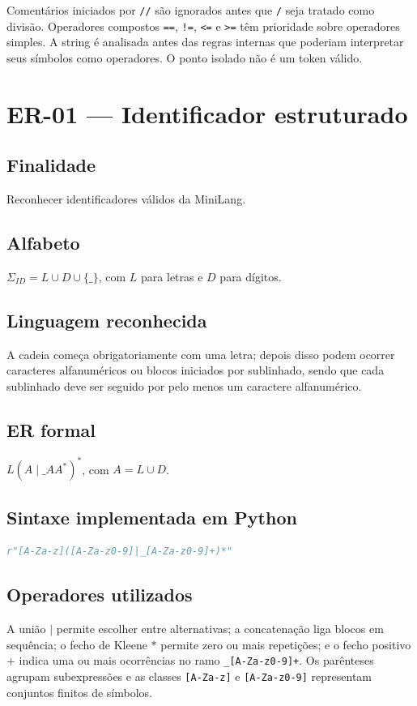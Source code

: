 \documentclass[12pt,a4paper,oneside]{report}
\begin{document}
Comentários iniciados por \texttt{//} são ignorados antes que \texttt{/} seja tratado como divisão. Operadores compostos \texttt{==}, \texttt{!=}, \texttt{<=} e \texttt{>=} têm prioridade sobre operadores simples. A string é analisada antes das regras internas que poderiam interpretar seus símbolos como operadores. O ponto isolado não é um token válido.



\section{ER-01 --- Identificador estruturado}
\subsection{Finalidade}
Reconhecer identificadores válidos da MiniLang.
\subsection{Alfabeto}
$\Sigma_{ID}=L\cup D\cup\{\_\}$, com $L$ para letras e $D$ para dígitos.
\subsection{Linguagem reconhecida}
A cadeia começa obrigatoriamente com uma letra; depois disso podem ocorrer caracteres alfanuméricos ou blocos iniciados por sublinhado, sendo que cada sublinhado deve ser seguido por pelo menos um caractere alfanumérico.
\subsection{ER formal}
$L(A\mid\_AA^*)^*$, com $A=L\cup D$.
\subsection{Sintaxe implementada em Python}
\begin{lstlisting}[language=Python]
r"[A-Za-z]([A-Za-z0-9]|_[A-Za-z0-9]+)*"
\end{lstlisting}
\subsection{Operadores utilizados}
A união $\mid$ permite escolher entre alternativas; a concatenação liga blocos em sequência; o fecho de Kleene $*$ permite zero ou mais repetições; e o fecho positivo $+$ indica uma ou mais ocorrências no ramo \texttt{\_[A-Za-z0-9]+}. Os parênteses agrupam subexpressões e as classes \texttt{[A-Za-z]} e \texttt{[A-Za-z0-9]} representam conjuntos finitos de símbolos.
\end{document}
